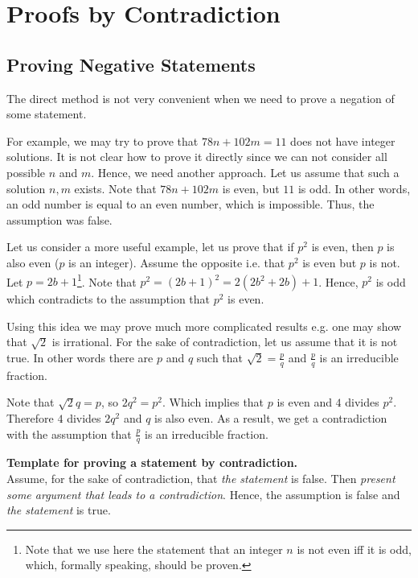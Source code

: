 \chapter{Proofs by Contradiction}
\label{chapter:indirect-proofs}
\section{Proving Negative Statements}
The direct method is not very convenient when we need to prove a negation of
some statement.

For example, we may try to prove that $78 n + 102 m = 11$ does not have integer
solutions. It is not clear how to prove it directly since we can not consider
all possible $n$ and $m$. Hence, we need another approach. Let us assume that
such a solution $n, m$ exists. Note that $78 n + 102 m$ is even, but $11$ is
odd. In other words, an odd number is equal to an even number, which is impossible.
Thus, the assumption was false.

Let us consider a more useful example, let us prove that if $p^2$ is even, then
$p$ is also even ($p$ is an integer). Assume the opposite i.e. that $p^2$ is
even but $p$ is not. Let $p = 2b + 1$\footnote{Note that we use here the
statement that an integer $n$ is not even iff it is odd, which, formally
speaking, should be proven.}. Note that $p^2 = (2b + 1)^2 = 2(2b^2 + 2b) + 1$.
Hence, $p^2$ is odd which contradicts to the assumption that $p^2$ is even.

Using this idea we may prove much more complicated results e.g. one may show
that $\sqrt{2}$ is irrational. For the sake of contradiction, let us assume
that it is not true. In other words there are $p$ and $q$ such that
$\sqrt{2} = \frac{p}{q}$ and $\frac{p}{q}$ is an irreducible fraction.

Note that $\sqrt{2} q = p$, so $2q^2 = p^2$. Which implies that $p$ is even
and $4$ divides $p^2$. Therefore $4$ divides $2q^2$ and $q$ is also even. As
a result, we get a contradiction with the assumption that $\frac{p}{q}$ is an
irreducible fraction.

\begin{template}
  \textbf{Template for proving a statement by contradiction.} \\

  Assume, for the sake of contradiction, that \emph{the statement} is false.
  Then \emph{present some argument that leads to a contradiction}. Hence, the
  assumption is false and \emph{the statement} is true.
\end{template}

